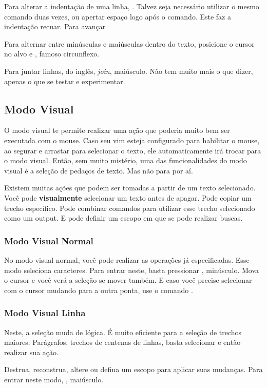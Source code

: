 Para alterar a indentação de uma linha, \vimcommand{$<$}.
Talvez seja necessário utilizar o mesmo comando duas vezes, ou apertar espaço logo após o comando.
Este faz a indentação recuar.
Para avançar \vimcommand{$>$}

Para alternar entre minúsculas e maiúsculas dentro do texto, posicione o cursor no alvo
e \vimcommand{\^}, famoso circunflexo. 

Para juntar linhas, do inglês, \textit{join},  maiúsculo.
Não tem muito mais o que dizer, apenas o que se testar e experimentar.

\subsection{Modo Visual}
O modo visual te permite realizar uma ação que poderia muito bem ser executada com o mouse.
Caso seu vim esteja configurado para habilitar o mouse, ao segurar e arrastar para selecionar o texto, ele automaticamente irá trocar para o modo visual.
Então, sem muito mistério, uma das funcionalidades do modo visual é a seleção de pedaços de texto. Mas não para por aí.

Existem muitas ações que podem ser tomadas a partir de um texto selecionado. Você pode \textbf{visualmente} selecionar um texto antes de apagar.
Pode copiar um trecho específico.
Pode combinar comandos para utilizar esse trecho selecionado como um output.
E pode definir um escopo em que se pode realizar buscas.

\subsubsection{Modo Visual Normal}
No modo visual normal, você pode realizar as operações já especificadas.
Esse modo seleciona caracteres.
Para entrar neste, basta pressionar , minúsculo.
Mova o cursor e você verá a seleção se mover também.
E caso você precise selecionar com o cursor mudando para a outra ponta, use o comando .

\subsubsection{Modo Visual Linha}
Neste, a seleção muda de lógica.
É muito eficiente para a seleção de trechos maiores.
Parágrafos, trechos de centenas de linhas, basta selecionar e então realizar sua ação.

Destrua, reconstrua, altere ou defina um escopo para aplicar suas mudanças.
Para entrar neste modo, , maiúsculo.

